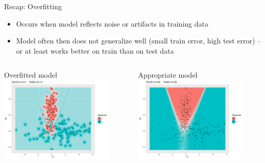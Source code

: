 \documentclass[11pt,compress,t,notes=noshow, xcolor=table]{beamer}
\begin{document}
\begin{vbframe}{Recap: Overfitting}


\begin{itemize}
  \item Occurs when model reflects noise or artifacts in training data 
  \item Model often then does not generalize well
  (small train error, high test error) -- or at least works better on train than on test data
\end{itemize}
\lz  \lz
\begin{columns}
\begin{column}{0.5\textwidth}
  \raggedright
  Overfitted model\\
  \includegraphics[width=0.85\textwidth]{figure/eval_ofit_1o}
\end{column}
\begin{column}{0.5\textwidth}
  \raggedright
    Appropriate model\\
  \includegraphics[width=0.85\textwidth]{figure/eval_ofit_1a}
\end{column}
\end{columns}
    
\end{vbframe}
\end{document}
